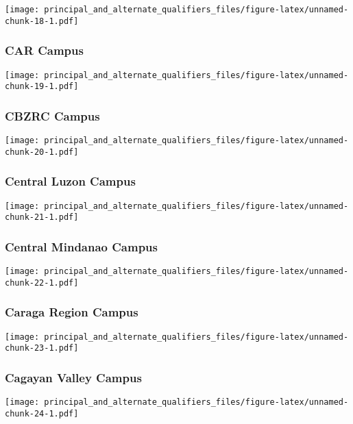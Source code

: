 \documentclass[]{article}
\begin{document}
\texttt{[image: principal\_and\_alternate\_qualifiers\_files/figure-latex/unnamed-chunk-18-1.pdf]}

\hypertarget{car-campus}{%
\subsubsection{CAR Campus}\label{car-campus}}

\texttt{[image: principal\_and\_alternate\_qualifiers\_files/figure-latex/unnamed-chunk-19-1.pdf]}

\hypertarget{cbzrc-campus}{%
\subsubsection{CBZRC Campus}\label{cbzrc-campus}}

\texttt{[image: principal\_and\_alternate\_qualifiers\_files/figure-latex/unnamed-chunk-20-1.pdf]}

\hypertarget{central-luzon-campus}{%
\subsubsection{Central Luzon Campus}\label{central-luzon-campus}}

\texttt{[image: principal\_and\_alternate\_qualifiers\_files/figure-latex/unnamed-chunk-21-1.pdf]}

\hypertarget{central-mindanao-campus}{%
\subsubsection{Central Mindanao Campus}\label{central-mindanao-campus}}

\texttt{[image: principal\_and\_alternate\_qualifiers\_files/figure-latex/unnamed-chunk-22-1.pdf]}

\hypertarget{caraga-region-campus}{%
\subsubsection{Caraga Region Campus}\label{caraga-region-campus}}

\texttt{[image: principal\_and\_alternate\_qualifiers\_files/figure-latex/unnamed-chunk-23-1.pdf]}

\hypertarget{cagayan-valley-campus}{%
\subsubsection{Cagayan Valley Campus}\label{cagayan-valley-campus}}

\texttt{[image: principal\_and\_alternate\_qualifiers\_files/figure-latex/unnamed-chunk-24-1.pdf]}
\end{document}
